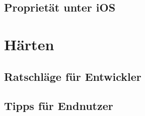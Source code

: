 \documentclass[aspectratio=169]{beamer}
\begin{document}
	\subsection{Proprietät unter iOS}
		
		
		
		
		
		
		
		
		
		
		
		

\section{Härten}
	\subsection{Ratschläge für Entwickler}
		
		
	\subsection{Tipps für Endnutzer}
		



\end{document}
